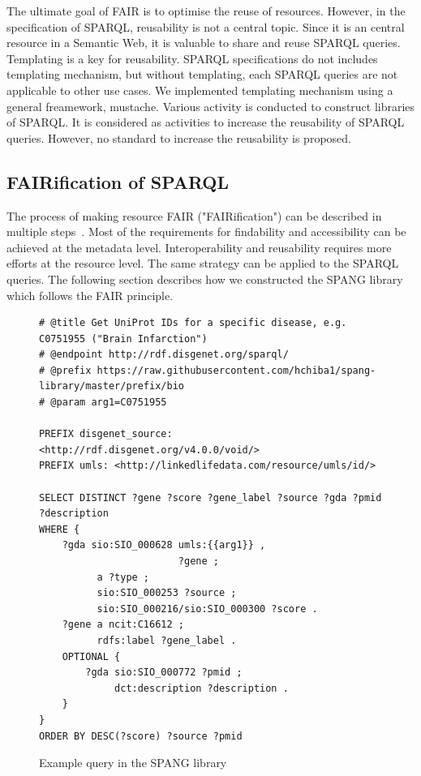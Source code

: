 \documentclass[runningheads]{llncs}
\begin{document}
The ultimate goal of FAIR is to optimise the reuse of resources. 
However, in the specification of SPARQL, reusability is not a central topic. 
Since it is an central resource in a Semantic Web, it is valuable to share and reuse SPARQL queries.
Templating is a key for reusability. 
SPARQL specifications do not includes templating mechanism, but without templating, each SPARQL queries are not applicable to other use cases. 
We implemented templating mechanism using a general freamework, mustache.
Various activity is conducted to construct libraries of SPARQL. 
It is considered as activities to increase the reusability of SPARQL queries. However, no standard to increase the reusability is proposed. 



\subsection{FAIRification of SPARQL}
The process of making resource FAIR ("FAIRification") can be described in multiple steps~\cite{fairification}.
Most of the requirements for findability and accessibility can be achieved at the metadata level. 
Interoperability and reusability requires more efforts at the resource level.
The same strategy can be applied to the SPARQL queries.
The following section describes how we constructed the SPANG library which follows the FAIR principle.

\begin{figure}[!t]
\begin{scriptsize}
\begin{verbatim}
# @title Get UniProt IDs for a specific disease, e.g. C0751955 ("Brain Infarction")
# @endpoint http://rdf.disgenet.org/sparql/
# @prefix https://raw.githubusercontent.com/hchiba1/spang-library/master/prefix/bio
# @param arg1=C0751955 

PREFIX disgenet_source: <http://rdf.disgenet.org/v4.0.0/void/>
PREFIX umls: <http://linkedlifedata.com/resource/umls/id/>

SELECT DISTINCT ?gene ?score ?gene_label ?source ?gda ?pmid ?description
WHERE {
    ?gda sio:SIO_000628 umls:{{arg1}} ,
                        ?gene ;
          a ?type ;
          sio:SIO_000253 ?source ;
          sio:SIO_000216/sio:SIO_000300 ?score .
    ?gene a ncit:C16612 ;
          rdfs:label ?gene_label .
    OPTIONAL {
        ?gda sio:SIO_000772 ?pmid ;
             dct:description ?description .
    }
}
ORDER BY DESC(?score) ?source ?pmid

\end{verbatim}
\end{scriptsize}
\caption{Example query in the SPANG library}
\label{fig:example-sparql}
\end{figure}
\end{document}
